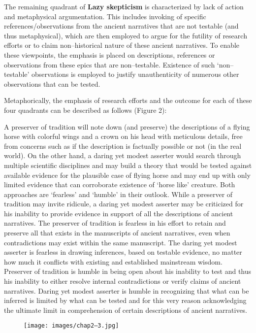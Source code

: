 The remaining quadrant of \textbf{Lazy skepticism} is characterized by lack of action and metaphysical argumentation. This includes invoking of specific references/observations from the ancient narratives that are not testable (and thus metaphysical), which are then employed to argue for the futility of research efforts or to claim non–historical nature of these ancient narratives. To enable these viewpoints, the emphasis is placed on descriptions, references or observations from these epics that are non–testable. Existence of such ‘non–testable’ observations is employed to justify unauthenticity of numerous other observations that can be tested.

Metaphorically, the emphasis of research efforts and the outcome for each of these four quadrants can be described as follows (Figure 2):

A preserver of tradition will note down (and preserve) the descriptions of a flying horse with colorful wings and a crown on his head with meticulous details, free from concerns such as if the description is factually possible or not (in the real world). On the other hand, a daring yet modest asserter would search through multiple scientific disciplines and may build a theory that would be tested against available evidence for the plausible case of flying horse and may end up with only limited evidence that can corroborate existence of ‘horse like’ creature. Both approaches are ‘fearless’ and ‘humble’ in their outlook. While a preserver of tradition may invite ridicule, a daring yet modest asserter may be criticized for his inability to provide evidence in support of all the descriptions of ancient narratives. The preserver of tradition is fearless in his effort to retain and preserve all that exists in the manuscripts of ancient narratives, even when contradictions may exist within the same manuscript. The daring yet modest asserter is fearless in drawing inferences, based on testable evidence, no matter how much it conflicts with existing and established mainstream wisdom. Preserver of tradition is humble in being open about his inability to test and thus his inability to either resolve internal contradictions or verify claims of ancient narratives. Daring yet modest asserter is humble in recognizing that what can be inferred is limited by what can be tested and for this very reason acknowledging the ultimate limit in comprehension of certain descriptions of ancient narratives.

\begin{figure}
\texttt{[image: images/chap2–3.jpg]}
\end{figure}

